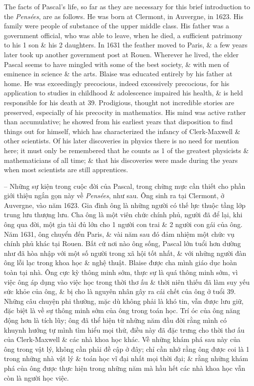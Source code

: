 \documentclass{article}
\begin{document}
\begin{enumerate}
\begin{itemize}
		The facts of {\sc Pascal}'s life, so far as they are necessary for this brief introduction to the {\it Pens\'ees}, are as follows. He was born at Clermont, in Auvergne, in 1623. His family were people of substance of the upper middle class. His father was a government official, who was able to leave, when he died, a sufficient patrimony to his 1 son \& his 2 daughters. In 1631 the feather moved to Paris, \& a few years later took up another government post at Rouen. Wherever he lived, the elder {\sc Pascal} seems to have mingled with some of the best society, \& with men of eminence in science \& the arts. {\sc Blaise} was educated entirely by his father at home. He was exceedingly precocious, indeed excessively precocious, for his application to studies in childhood \& adolescence impaired his health, \& is held responsible for his death at 39. Prodigious, thought not incredible stories are preserved, especially of his precocity in mathematics. His mind was active rather than accumulative; he showed from his earliest years that disposition to find things out for himself, which has characterized the infancy of {\sc Clerk-Maxwell} \& other scientists. Of his later discoveries in physics there is no need for mention here; it must only be remembered that he counts as 1 of the greatest physicists \& mathematicians of all time; \& that his discoveries were made during the years when most scientists are still apprentices.
		
		-- Những sự kiện trong cuộc đời của {\sc Pascal}, trong chừng mực cần thiết cho phần giới thiệu ngắn gọn này về {\it Pens\'ees}, như sau. Ông sinh ra tại Clermont, ở Auvergne, vào năm 1623. Gia đình ông là những người có thế lực thuộc tầng lớp trung lưu thượng lưu. Cha ông là một viên chức chính phủ, người đã để lại, khi ông qua đời, một gia tài đủ lớn cho 1 người con trai \& 2 người con gái của ông. Năm 1631, ông chuyển đến Paris, \& vài năm sau đó đảm nhiệm một chức vụ chính phủ khác tại Rouen. Bất cứ nơi nào ông sống, {\sc Pascal} lớn tuổi hơn dường như đã hòa nhập với một số người trong xã hội tốt nhất, \& với những người đàn ông lỗi lạc trong khoa học \& nghệ thuật. {\sc Blaise} được cha mình giáo dục hoàn toàn tại nhà. Ông cực kỳ thông minh sớm, thực sự là quá thông minh sớm, vì việc ông áp dụng vào việc học trong thời thơ ấu \& thời niên thiếu đã làm suy yếu sức khỏe của ông, \& bị cho là nguyên nhân gây ra cái chết của ông ở tuổi 39. Những câu chuyện phi thường, mặc dù không phải là khó tin, vẫn được lưu giữ, đặc biệt là về sự thông minh sớm của ông trong toán học. Trí óc của ông năng động hơn là tích lũy; ông đã thể hiện từ những năm đầu đời rằng mình có khuynh hướng tự mình tìm hiểu mọi thứ, điều này đã đặc trưng cho thời thơ ấu của {\sc Clerk-Maxwell} \& các nhà khoa học khác. Về những khám phá sau này của ông trong vật lý, không cần phải đề cập ở đây; chỉ cần nhớ rằng ông được coi là 1 trong những nhà vật lý \& toán học vĩ đại nhất mọi thời đại; \& rằng những khám phá của ông được thực hiện trong những năm mà hầu hết các nhà khoa học vẫn còn là người học việc.
		

\end{itemize}
\end{enumerate}
\end{document}
